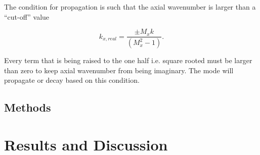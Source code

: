 \documentclass[a4paper]{report}
\begin{document}
The condition for propagation is such that the axial wavenumber is larger than 
a ``cut-off'' value

\begin{equation}
    k_{x,real}  = \frac{\pm M_x k }{\left( M_x^2 - 1 \right)}.
    \label{eqn:cuton}
\end{equation}

Every term that is being raised to the one half i.e. square rooted must 
be larger than zero to keep axial wavenumber from being imaginary. The mode 
will propagate or decay based on this condition. 

\subsection{Methods}

\section{Results and Discussion}

% 
\end{document}
